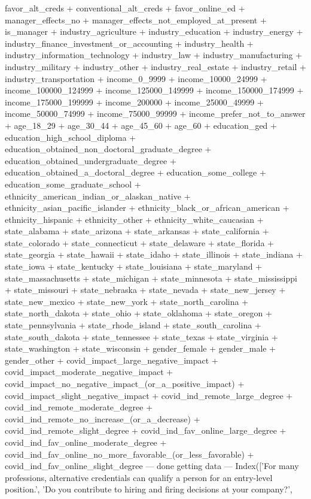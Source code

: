 favor_alt_creds + conventional_alt_creds + favor_online_ed + manager_effects_no + manager_effects_not_employed_at_present + is_manager + industry_agriculture + industry_education + industry_energy + industry_finance_investment_or_accounting + industry_health + industry_information_technology + industry_law + industry_manufacturing + industry_military + industry_other + industry_real_estate + industry_retail + industry_transportation + income_0_9999 + income_10000_24999 + income_100000_124999 + income_125000_149999 + income_150000_174999 + income_175000_199999 + income_200000 + income_25000_49999 + income_50000_74999 + income_75000_99999 + income_prefer_not_to_answer + age_18_29 + age_30_44 + age_45_60 + age_60 + education_ged + education_high_school_diploma + education_obtained_non_doctoral_graduate_degree + education_obtained_undergraduate_degree + education_obtained_a_doctoral_degree + education_some_college + education_some_graduate_school + ethnicity_american_indian_or_alaskan_native + ethnicity_asian_pacific_islander + ethnicity_black_or_african_american + ethnicity_hispanic + ethnicity_other + ethnicity_white_caucasian + state_alabama + state_arizona + state_arkansas + state_california + state_colorado + state_connecticut + state_delaware + state_florida + state_georgia + state_hawaii + state_idaho + state_illinois + state_indiana + state_iowa + state_kentucky + state_louisiana + state_maryland + state_massachusetts + state_michigan + state_minnesota + state_mississippi + state_missouri + state_nebraska + state_nevada + state_new_jersey + state_new_mexico + state_new_york + state_north_carolina + state_north_dakota + state_ohio + state_oklahoma + state_oregon + state_pennsylvania + state_rhode_island + state_south_carolina + state_south_dakota + state_tennessee + state_texas + state_virginia + state_washington + state_wisconsin + gender_female + gender_male + gender_other + covid_impact_large_negative_impact + covid_impact_moderate_negative_impact + covid_impact_no_negative_impact_(or_a_positive_impact) + covid_impact_slight_negative_impact + covid_ind_remote_large_degree + covid_ind_remote_moderate_degree + covid_ind_remote_no_increase_(or_a_decrease) + covid_ind_remote_slight_degree + covid_ind_fav_online_large_degree + covid_ind_fav_online_moderate_degree + covid_ind_fav_online_no_more_favorable_(or_less_favorable) + covid_ind_fav_online_slight_degree
---
done getting data
---
Index(['For many professions, alternative credentials can qualify a person for an entry-level position.',
       'Do you contribute to hiring and firing decisions at your company?',
